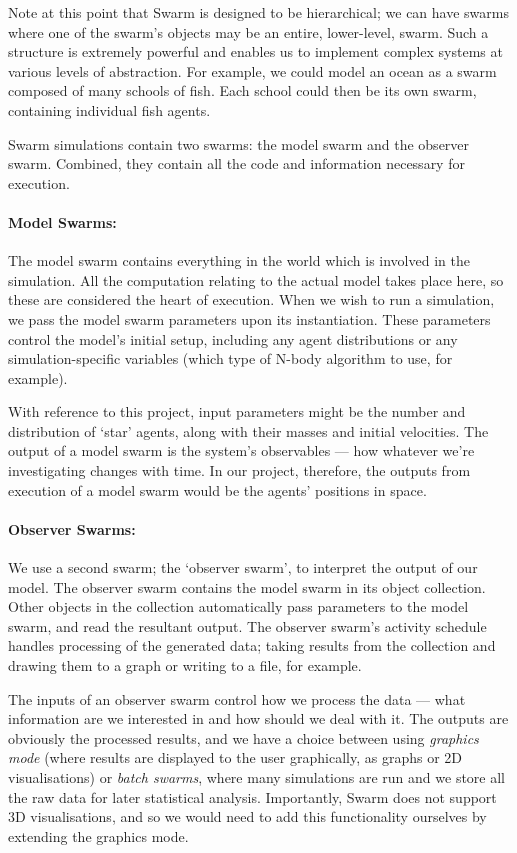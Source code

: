 \documentclass[11pt,a4paper]{article}
\begin{document}
Note at this point that Swarm is designed to be hierarchical; we can have swarms where one of the swarm's objects may be an entire, lower-level, swarm. Such a structure is extremely powerful and enables us to implement complex systems at various levels of abstraction. For example, we could model an ocean as a swarm composed of many schools of fish. Each school could then be its own swarm, containing individual fish agents.

Swarm simulations contain two swarms: the model swarm and the observer swarm. Combined, they contain all the code and information necessary for execution.

\paragraph{Model Swarms:}
The model swarm contains everything in the world which is involved in the simulation. All the computation relating to the actual model takes place here, so these are considered the heart of execution.
When we wish to run a simulation, we pass the model swarm parameters upon its instantiation. These parameters control the model's initial setup, including any agent distributions or any simulation-specific variables (which type of N-body algorithm to use, for example).

With reference to this project, input parameters might be the number and distribution of `star' agents, along with their masses and initial velocities. The output of a model swarm is the system's observables --- how whatever we're investigating changes with time. In our project, therefore, the outputs from execution of a model swarm would be the agents' positions in space.

\paragraph{Observer Swarms:}
We use a second swarm; the `observer swarm', to interpret the output of our model. The observer swarm contains the model swarm in its object collection. Other objects in the collection automatically pass parameters to the model swarm, and read the resultant output. The observer swarm's activity schedule handles processing of the generated data; taking results from the collection and drawing them to a graph or writing to a file, for example. 

The inputs of an observer swarm control how we process the data --- what information are we interested in and how should we deal with it. The outputs are obviously the processed results, and we have a choice between using \emph{graphics mode} (where results are displayed to the user graphically, as graphs or 2D visualisations) or \emph{batch swarms}, where many simulations are run and we store all the raw data for later statistical analysis. Importantly, Swarm does not support 3D visualisations, and so we would need to add this functionality ourselves by extending the graphics mode.
\end{document}
